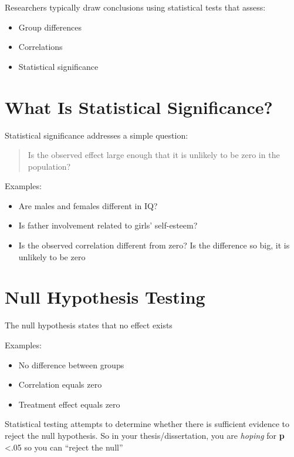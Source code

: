 \documentclass[
  letterpaper,
  DIV=11,
  numbers=noendperiod]{scrreprt}
\providecommand{\tightlist}{%
  \setlength{\itemsep}{0pt}\setlength{\parskip}{0pt}}
\begin{document}
Researchers typically draw conclusions using statistical tests that
assess:

\begin{itemize}
\tightlist
\item
  Group differences
\item
  Correlations
\item
  Statistical significance
\end{itemize}


\chapter{What Is Statistical
Significance?}\label{what-is-statistical-significance}

Statistical significance addresses a simple question:

\begin{quote}
Is the observed effect large enough that it is unlikely to be zero in
the population?
\end{quote}

Examples:

\begin{itemize}
\tightlist
\item
  Are males and females different in IQ?
\item
  Is father involvement related to girls' self-esteem?
\item
  Is the observed correlation different from zero? Is the difference so
  big, it is unlikely to be zero
\end{itemize}


\chapter{Null Hypothesis Testing}\label{null-hypothesis-testing}

The null hypothesis states that no effect exists

Examples:

\begin{itemize}
\tightlist
\item
  No difference between groups
\item
  Correlation equals zero
\item
  Treatment effect equals zero
\end{itemize}

Statistical testing attempts to determine whether there is sufficient
evidence to reject the null hypothesis. So in your thesis/dissertation,
you are \emph{hoping} for \textbf{p} \textless.05 so you can ``reject
the null''
\end{document}
